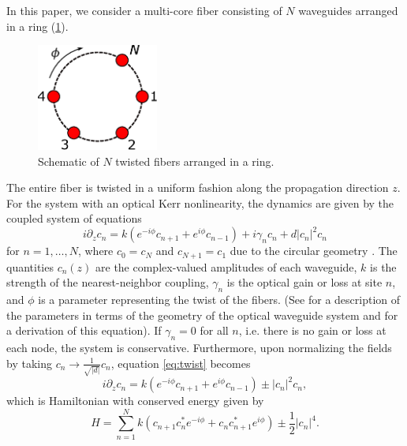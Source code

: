 \documentclass[12pt,reqno]{amsart}
\def\noi{\noindent}
\begin{document}
In this paper, we consider a multi-core fiber consisting of $N$ waveguides arranged in a ring (\cref{fig:ring}).
\begin{figure}[H]
\begin{center}
\includegraphics[width=4cm]{circle}
\end{center}
\caption{Schematic of $N$ twisted fibers arranged in a ring.}
\label{fig:ring}
\end{figure}
\noi The entire fiber is twisted in a uniform fashion along the propagation direction $z$. For the system with an optical Kerr nonlinearity, the dynamics are given by the coupled system of equations
\begin{equation}\label{eq:twist}
i \partial_z c_n = k \left(e^{-i\phi}c_{n+1} + e^{i\phi}c_{n-1}\right) + i \gamma_n c_n + d |c_n|^2 c_n
\end{equation}
for $n = 1, \dots, N$, where $c_0 = c_{N}$ and $c_{N+1} = c_1$ due to the circular geometry \cite{castro2016,Parto2017}. The quantities $c_n(z)$ are the complex-valued amplitudes of each waveguide, $k$ is the strength of the nearest-neighbor coupling, $\gamma_n$ is the optical gain or loss at site $n$, and $\phi$ is a parameter representing the twist of the fibers. (See \cite[section 2]{castro2016} for a description of the parameters in terms of the geometry of the optical waveguide system and \cite{Longhi2007b,Garanovich2012} for a derivation of this equation). If $\gamma_n = 0$ for all $n$, i.e. there is no gain or loss at each node, the system is conservative. Furthermore, upon normalizing the fields by taking $c_n \rightarrow \frac{1}{\sqrt{|d|}}c_n$,  equation \cref{eq:twist} becomes
\begin{equation}\label{eq:twist1}
i \partial_z c_n = k \left(e^{-i\phi}c_{n+1} + e^{i\phi}c_{n-1}\right)  \pm |c_n|^2 c_n,
\end{equation}
which is Hamiltonian with conserved energy given by
\begin{equation}
H = \sum_{n=1}^N k (c_{n+1}c_n^* e^{-i \phi} + c_n c_{n+1}^* e^{i \phi}) \pm \frac{1}{2}|c_n|^4.
\end{equation}
\end{document}
